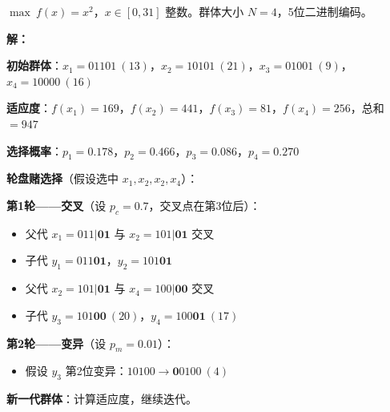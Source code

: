 \begin{example}\label{ex:ga}
$\max\ f(x) = x^2$，$x \in [0, 31]$ 整数。群体大小 $N=4$，5位二进制编码。

\textbf{解：}

\textbf{初始群体}：$x_1 = 01101\ (13)$，$x_2 = 10101\ (21)$，$x_3 = 01001\ (9)$，$x_4 = 10000\ (16)$

\textbf{适应度}：$f(x_1)=169$，$f(x_2)=441$，$f(x_3)=81$，$f(x_4)=256$，总和 $= 947$

\textbf{选择概率}：$p_1=0.178$，$p_2=0.466$，$p_3=0.086$，$p_4=0.270$

\textbf{轮盘赌选择}（假设选中 $x_1, x_2, x_2, x_4$）：

\textbf{第1轮——交叉}（设 $p_c = 0.7$，交叉点在第3位后）：
\begin{itemize}
    \item 父代 $x_1=011|\textbf{01}$ 与 $x_2=101|\textbf{01}$ 交叉
    \item 子代 $y_1 = 011\textbf{01}$，$y_2 = 101\textbf{01}$
    \item 父代 $x_2=101|\textbf{01}$ 与 $x_4=100|\textbf{00}$ 交叉
    \item 子代 $y_3 = 101\textbf{00}\ (20)$，$y_4 = 100\textbf{01}\ (17)$
\end{itemize}

\textbf{第2轮——变异}（设 $p_m = 0.01$）：
\begin{itemize}
    \item 假设 $y_3$ 第2位变异：$10100 \to \textbf{0}0100\ (4)$
\end{itemize}

\textbf{新一代群体}：计算适应度，继续迭代。
\end{example}

